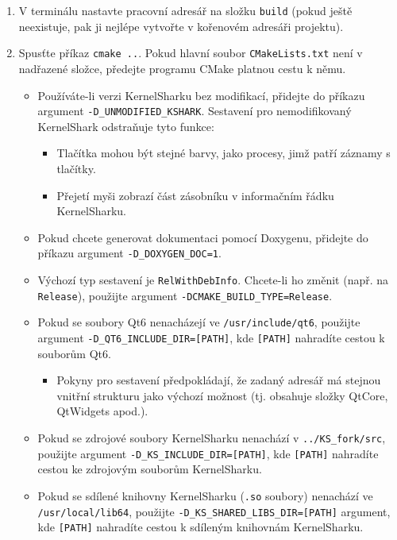 \begin{enumerate}
  \item V terminálu nastavte pracovní adresář na složku \texttt{build} (pokud ještě neexistuje, pak ji nejlépe vytvořte v kořenovém adresáři projektu).
  \item Spusťte příkaz \texttt{cmake ..}. Pokud hlavní soubor \texttt{CMakeLists.txt} není v nadřazené složce, předejte programu CMake platnou cestu k němu.
    \begin{itemize}
      \item Používáte-li verzi KernelSharku bez modifikací, přidejte do příkazu argument \texttt{-D\_UNMODIFIED\_KSHARK}.
      Sestavení pro nemodifikovaný KernelShark odstraňuje tyto funkce:
      \begin{itemize}
        \item Tlačítka mohou být stejné barvy, jako procesy, jimž patří záznamy s tlačítky.
        \item Přejetí myši zobrazí část zásobníku v informačním řádku KernelSharku.
      \end{itemize}
      \item Pokud chcete generovat dokumentaci pomocí Doxygenu, přidejte do příkazu argument \texttt{-D\_DOXYGEN\_DOC=1}.
      \item Výchozí typ sestavení je \texttt{RelWithDebInfo}. Chcete-li ho změnit (např. na \texttt{Release}), použijte argument \texttt{-DCMAKE\_BUILD\_TYPE=Release}.
      \item Pokud se soubory Qt6 nenacházejí ve \texttt{/usr/include/qt6}, použijte argument \texttt{-D\_QT6\_INCLUDE\_DIR=[PATH]}, kde \texttt{[PATH]} nahradíte cestou k souborům Qt6.
        \begin{itemize}
          \item Pokyny pro sestavení předpokládají, že zadaný adresář má stejnou vnitřní strukturu jako výchozí možnost (tj. obsahuje složky QtCore, QtWidgets apod.).
        \end{itemize}
      \item Pokud se zdrojové soubory KernelSharku nenachází v \texttt{../KS\_fork/src}, použijte argument \texttt{-D\_KS\_INCLUDE\_DIR=[PATH]}, kde \texttt{[PATH]} nahradíte cestou ke zdrojovým souborům KernelSharku.
      \item Pokud se sdílené knihovny KernelSharku (\texttt{.so} soubory) nenachází ve \texttt{/usr/local/lib64}, použijte \texttt{-D\_KS\_SHARED\_LIBS\_DIR=[PATH]} argument, kde \texttt{[PATH]} nahradíte cestou k sdíleným knihovnám KernelSharku.
    \end{itemize}

\end{enumerate}
